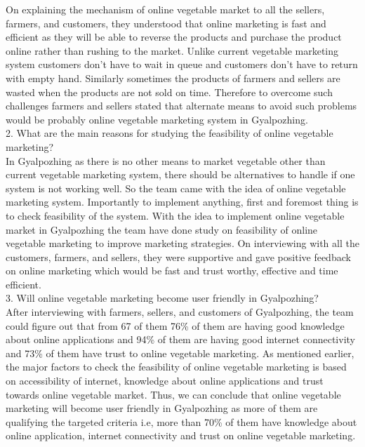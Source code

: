 \documentclass[12pt]{report}
\begin{document}
\begin{normalsize}
On explaining the mechanism of online vegetable market to all the sellers, farmers, and customers, they understood that  online marketing is fast and efficient as they will be able to reverse the  products and purchase the product  online  rather than rushing to the  market. Unlike current vegetable marketing system customers don’t have to wait in queue and customers don’t have to return with empty hand.  
Similarly sometimes the products of farmers and sellers are wasted when the products are not sold on time. Therefore to overcome such challenges farmers and sellers stated that alternate means to avoid such problems would be probably online vegetable marketing system in Gyalpozhing.\newline\\[0.1cm]
2. What are the main reasons for studying the feasibility of online vegetable marketing?\newline\\[0.1cm]
In Gyalpozhing as there is no other means to market vegetable other than current vegetable marketing system, there should be alternatives to handle if one system is not working well. So the team came with the idea of online vegetable marketing system. Importantly to implement anything, first and foremost thing is to check feasibility of the system. With the idea to implement online vegetable market in Gyalpozhing the team have done study on feasibility of online vegetable marketing to improve marketing strategies. On interviewing with all the customers, farmers, and sellers, they were supportive and gave  positive feedback on online marketing which would be fast and trust worthy, effective and time efficient.\newline\\[0.1cm]
3. Will online vegetable marketing become user friendly in Gyalpozhing?\newline\\[0.1cm]
After interviewing with  farmers, sellers, and customers of Gyalpozhing, the team could figure out that from 67 of them 76\% of them are  having good knowledge about online applications and 94\% of  them are having good internet connectivity and 73\% of them have trust to online vegetable marketing. As mentioned earlier, the major factors to check the feasibility of online vegetable marketing is based on accessibility of internet, knowledge about online applications and trust towards online vegetable market. Thus, we can conclude that online vegetable marketing will become user friendly in Gyalpozhing as more of them are  qualifying the targeted criteria i.e,  more than 70\% of them have knowledge about online application, internet connectivity and trust on online vegetable marketing.\newline\\[0.1cm]

\end{normalsize}
\end{document}
